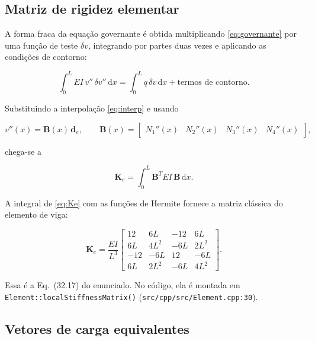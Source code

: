 \documentclass[12pt,a4paper]{article}
\newcommand{\dd}{\mathrm{d}}
\begin{document}
\subsection{Matriz de rigidez elementar}
\label{sec:rigidez}

A forma fraca da equação governante é obtida multiplicando \eqref{eq:governante} por uma função de teste \(\delta v\), integrando por partes duas vezes e aplicando as condições de contorno:

\begin{equation}
  \int_0^L EI\,v''\,\delta v''\,\dd x
  =
  \int_0^L q\,\delta v\,\dd x
  +
  \text{termos de contorno}.
  \label{eq:fraca}
\end{equation}

Substituindo a interpolação \eqref{eq:interp} e usando

\begin{equation}
  v''(x) = \mathbf{B}(x)\,\mathbf{d}_e,
  \qquad
  \mathbf{B}(x) =
  \begin{bmatrix}
    N_1''(x) & N_2''(x) & N_3''(x) & N_4''(x)
  \end{bmatrix},
  \label{eq:B}
\end{equation}

chega-se a

\begin{equation}
  \mathbf{K}_e = \int_0^L \mathbf{B}^T EI\,\mathbf{B}\,\dd x.
  \label{eq:Ke}
\end{equation}

A integral de \eqref{eq:Ke} com as funções de Hermite fornece a matriz clássica do elemento de viga:

\begin{equation}
  \mathbf{K}_e =
  \frac{EI}{L^3}
  \begin{bmatrix}
    12   & 6L   & -12  & 6L \\
    6L   & 4L^2 & -6L  & 2L^2 \\
    -12  & -6L  & 12   & -6L \\
    6L   & 2L^2 & -6L  & 4L^2
  \end{bmatrix}.
  \label{eq:Ke32}
\end{equation}

Essa é a Eq.~(32.17) do enunciado. No código, ela é montada em \texttt{Element::localStiffnessMatrix()} (\texttt{src/cpp/src/Element.cpp:30}).

\subsection{Vetores de carga equivalentes}
\label{sec:cargas}
\end{document}
